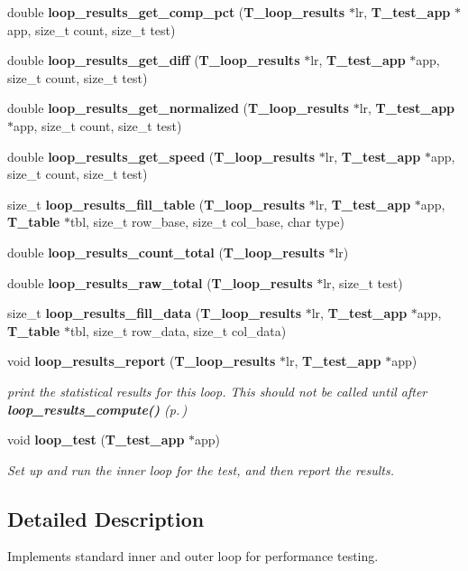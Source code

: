 \begin{CompactItemize}
double {\bf loop\_\-results\_\-get\_\-comp\_\-pct} ({\bf T\_\-loop\_\-results} $\ast$lr, {\bf T\_\-test\_\-app} $\ast$app, size\_\-t count, size\_\-t test)
\item 
double {\bf loop\_\-results\_\-get\_\-diff} ({\bf T\_\-loop\_\-results} $\ast$lr, {\bf T\_\-test\_\-app} $\ast$app, size\_\-t count, size\_\-t test)
\item 
double {\bf loop\_\-results\_\-get\_\-normalized} ({\bf T\_\-loop\_\-results} $\ast$lr, {\bf T\_\-test\_\-app} $\ast$app, size\_\-t count, size\_\-t test)
\item 
double {\bf loop\_\-results\_\-get\_\-speed} ({\bf T\_\-loop\_\-results} $\ast$lr, {\bf T\_\-test\_\-app} $\ast$app, size\_\-t count, size\_\-t test)
\item 
size\_\-t {\bf loop\_\-results\_\-fill\_\-table} ({\bf T\_\-loop\_\-results} $\ast$lr, {\bf T\_\-test\_\-app} $\ast$app, {\bf T\_\-table} $\ast$tbl, size\_\-t row\_\-base, size\_\-t col\_\-base, char type)
\item 
double {\bf loop\_\-results\_\-count\_\-total} ({\bf T\_\-loop\_\-results} $\ast$lr)
\item 
double {\bf loop\_\-results\_\-raw\_\-total} ({\bf T\_\-loop\_\-results} $\ast$lr, size\_\-t test)
\item 
size\_\-t {\bf loop\_\-results\_\-fill\_\-data} ({\bf T\_\-loop\_\-results} $\ast$lr, {\bf T\_\-test\_\-app} $\ast$app, {\bf T\_\-table} $\ast$tbl, size\_\-t row\_\-data, size\_\-t col\_\-data)
\item 
void {\bf loop\_\-results\_\-report} ({\bf T\_\-loop\_\-results} $\ast$lr, {\bf T\_\-test\_\-app} $\ast$app)
\begin{CompactList}\small\item\em print the statistical results for this loop. This should not be called until after {\bf loop\_\-results\_\-compute()} {\rm (p.\,\pageref{group__loop__test_a7})}\item\end{CompactList}\item 
void {\bf loop\_\-test} ({\bf T\_\-test\_\-app} $\ast$app)
\begin{CompactList}\small\item\em Set up and run the inner loop for the test, and then report the results.\item\end{CompactList}\end{CompactItemize}


\subsection{Detailed Description}
Implements standard inner and outer loop for performance testing.



